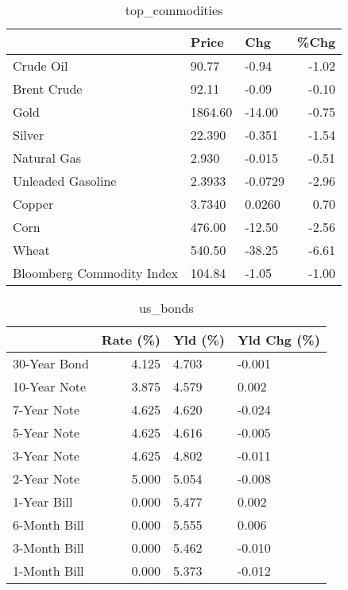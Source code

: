\documentclass{article}%
\begin{document}
\begin{table}[htbp]%
\caption{top\_commodities}%
\centering%
\begin{adjustbox}{width=1\textwidth}%
\begin{tabular}{lllr}
\toprule
                          &   Price &     Chg &  \%Chg \\
\midrule
               Crude Oil  &   90.77 &   -0.94 & -1.02 \\
             Brent Crude  &   92.11 &   -0.09 & -0.10 \\
                    Gold  & 1864.60 &  -14.00 & -0.75 \\
                  Silver  &  22.390 &  -0.351 & -1.54 \\
             Natural Gas  &   2.930 &  -0.015 & -0.51 \\
       Unleaded Gasoline  &  2.3933 & -0.0729 & -2.96 \\
                  Copper  &  3.7340 &  0.0260 &  0.70 \\
                    Corn  &  476.00 &  -12.50 & -2.56 \\
                   Wheat  &  540.50 &  -38.25 & -6.61 \\
Bloomberg Commodity Index &  104.84 &   -1.05 & -1.00 \\
\bottomrule
\end{tabular}
%
\end{adjustbox}%
\end{table}

%


\begin{table}[htbp]%
\caption{us\_bonds}%
\centering%
\begin{adjustbox}{width=1\textwidth}%
\begin{tabular}{lrll}
\toprule
             &  Rate (\%) & Yld (\%) & Yld Chg (\%) \\
\midrule
30-Year Bond &     4.125 &   4.703 &      -0.001 \\
10-Year Note &     3.875 &   4.579 &       0.002 \\
 7-Year Note &     4.625 &   4.620 &      -0.024 \\
 5-Year Note &     4.625 &   4.616 &      -0.005 \\
 3-Year Note &     4.625 &   4.802 &      -0.011 \\
 2-Year Note &     5.000 &   5.054 &      -0.008 \\
 1-Year Bill &     0.000 &   5.477 &       0.002 \\
6-Month Bill &     0.000 &   5.555 &       0.006 \\
3-Month Bill &     0.000 &   5.462 &      -0.010 \\
1-Month Bill &     0.000 &   5.373 &      -0.012 \\
\bottomrule
\end{tabular}
%
\end{adjustbox}%
\end{table}
\end{document}
